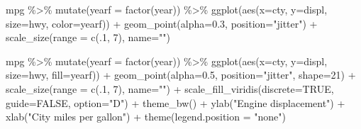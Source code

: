 \documentclass[
]{book}
\newenvironment{Shaded}{\begin{snugshade}}{\end{snugshade}}
\newcommand{\AttributeTok}[1]{\textcolor[rgb]{0.77,0.63,0.00}{#1}}
\newcommand{\ConstantTok}[1]{\textcolor[rgb]{0.00,0.00,0.00}{#1}}
\newcommand{\DecValTok}[1]{\textcolor[rgb]{0.00,0.00,0.81}{#1}}
\newcommand{\FloatTok}[1]{\textcolor[rgb]{0.00,0.00,0.81}{#1}}
\newcommand{\FunctionTok}[1]{\textcolor[rgb]{0.00,0.00,0.00}{#1}}
\newcommand{\NormalTok}[1]{#1}
\newcommand{\SpecialCharTok}[1]{\textcolor[rgb]{0.00,0.00,0.00}{#1}}
\newcommand{\StringTok}[1]{\textcolor[rgb]{0.31,0.60,0.02}{#1}}
\begin{document}
\begin{Shaded}
\begin{Highlighting}[]
\NormalTok{mpg }\SpecialCharTok{\%\textgreater{}\%} 
  \FunctionTok{mutate}\NormalTok{(}\AttributeTok{yearf =} \FunctionTok{factor}\NormalTok{(year)) }\SpecialCharTok{\%\textgreater{}\%} 
  \FunctionTok{ggplot}\NormalTok{(}\FunctionTok{aes}\NormalTok{(}\AttributeTok{x=}\NormalTok{cty, }\AttributeTok{y=}\NormalTok{displ, }\AttributeTok{size=}\NormalTok{hwy, }\AttributeTok{color=}\NormalTok{yearf)) }\SpecialCharTok{+}
  \FunctionTok{geom\_point}\NormalTok{(}\AttributeTok{alpha=}\FloatTok{0.3}\NormalTok{, }\AttributeTok{position=}\StringTok{"jitter"}\NormalTok{) }\SpecialCharTok{+}
  \FunctionTok{scale\_size}\NormalTok{(}\AttributeTok{range =} \FunctionTok{c}\NormalTok{(.}\DecValTok{1}\NormalTok{, }\DecValTok{7}\NormalTok{), }\AttributeTok{name=}\StringTok{""}\NormalTok{) }
\end{Highlighting}
\end{Shaded}

\begin{Shaded}
\begin{Highlighting}[]
\NormalTok{mpg }\SpecialCharTok{\%\textgreater{}\%} 
  \FunctionTok{mutate}\NormalTok{(}\AttributeTok{yearf =} \FunctionTok{factor}\NormalTok{(year)) }\SpecialCharTok{\%\textgreater{}\%} 
  \FunctionTok{ggplot}\NormalTok{(}\FunctionTok{aes}\NormalTok{(}\AttributeTok{x=}\NormalTok{cty, }\AttributeTok{y=}\NormalTok{displ, }\AttributeTok{size=}\NormalTok{hwy, }\AttributeTok{fill=}\NormalTok{yearf)) }\SpecialCharTok{+}
  \FunctionTok{geom\_point}\NormalTok{(}\AttributeTok{alpha=}\FloatTok{0.5}\NormalTok{, }\AttributeTok{position=}\StringTok{"jitter"}\NormalTok{, }\AttributeTok{shape=}\DecValTok{21}\NormalTok{) }\SpecialCharTok{+}
  \FunctionTok{scale\_size}\NormalTok{(}\AttributeTok{range =} \FunctionTok{c}\NormalTok{(.}\DecValTok{1}\NormalTok{, }\DecValTok{7}\NormalTok{), }\AttributeTok{name=}\StringTok{""}\NormalTok{) }\SpecialCharTok{+} 
  \FunctionTok{scale\_fill\_viridis}\NormalTok{(}\AttributeTok{discrete=}\ConstantTok{TRUE}\NormalTok{, }\AttributeTok{guide=}\ConstantTok{FALSE}\NormalTok{, }\AttributeTok{option=}\StringTok{"D"}\NormalTok{) }\SpecialCharTok{+}
  \FunctionTok{theme\_bw}\NormalTok{() }\SpecialCharTok{+}
  \FunctionTok{ylab}\NormalTok{(}\StringTok{"Engine displacement"}\NormalTok{) }\SpecialCharTok{+}
  \FunctionTok{xlab}\NormalTok{(}\StringTok{"City miles per gallon"}\NormalTok{) }\SpecialCharTok{+}
  \FunctionTok{theme}\NormalTok{(}\AttributeTok{legend.position =} \StringTok{"none"}\NormalTok{)}
\end{Highlighting}
\end{Shaded}
\end{document}
